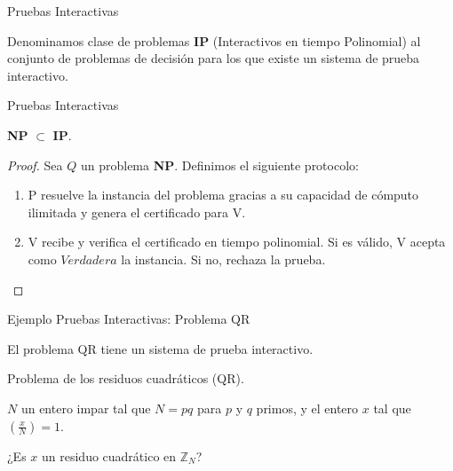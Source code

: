\documentclass{beamer}
\begin{document}
\begin{frame}{Pruebas Interactivas}


\begin{definition}
	Denominamos clase de problemas \textbf{IP} (Interactivos en tiempo Polinomial) al conjunto de problemas de decisión para los que existe un sistema de prueba interactivo.
\end{definition}


\end{frame}



\begin{frame}{Pruebas Interactivas}
	\begin{theorem}
		\textbf{NP} $\subset$ \textbf{IP}.
	\end{theorem}
	
	\begin{proof}
		Sea $Q$ un problema \textbf{NP}. Definimos el siguiente protocolo:
		\begin{enumerate}
			\item  P resuelve la instancia del problema gracias a su capacidad de cómputo ilimitada y genera el certificado para V.
			\item  V recibe y verifica el certificado en tiempo polinomial. Si es válido, V acepta como $Verdadera$ la instancia. Si no, rechaza la prueba.
		\end{enumerate}
	\end{proof}
\end{frame}




\begin{frame}{Ejemplo Pruebas Interactivas: Problema QR}
	\begin{theorem}
		El problema QR tiene un sistema de prueba interactivo.
	\end{theorem}

	\begin{description}[Parámetros]
		\item[Nombre] Problema de los residuos cuadr\'aticos (QR).
		\item[Parámetros] $N$ un entero impar tal que $N = pq$ para $p$ y $q$ primos, y el entero $x$ tal que $\left( \frac{x}{N} \right) = 1$.
		\item[Pregunta] ¿Es $x$ un residuo cuadrático en ${\mathbb Z}_N$?
	\end{description}
\end{frame}
\end{document}
